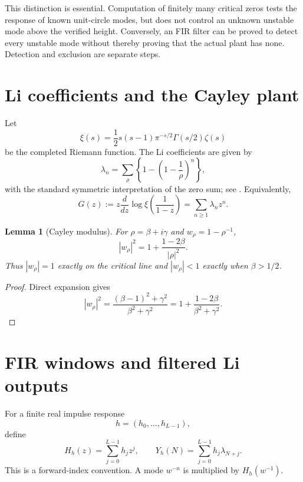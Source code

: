 \documentclass[11pt]{amsart}
\numberwithin{equation}{section}
\newtheorem{lemma}[theorem]{Lemma}
\theoremstyle{definition}
\theoremstyle{remark}
\begin{document}
This distinction is essential. Computation of finitely many critical zeros
tests the response of known unit-circle modes, but does not control an
unknown unstable mode above the verified height. Conversely, an FIR filter
can be proved to detect every unstable mode without thereby proving that the
actual plant has none. Detection and exclusion are separate steps.

\section{Li coefficients and the Cayley plant}
\label{sec:modes}

Let
\[
 \xi(s)=\frac12s(s-1)\pi^{-s/2}\Gamma(s/2)\zeta(s)
\]
be the completed Riemann function. The Li coefficients are given by
\begin{equation}
 \lambda_n=\sum_\rho\left\{1-\left(1-\frac1\rho\right)^n\right\},
                                                        \label{eq:2.1}
\end{equation}
with the standard symmetric interpretation of the zero sum; see
\cite{Li,BombieriLagarias}. Equivalently,
\begin{equation}
 G(z):=z\frac{d}{dz}\log\xi\!\left(\frac1{1-z}\right)
      =\sum_{n\ge1}\lambda_nz^n.                         \label{eq:2.2}
\end{equation}

\begin{lemma}[Cayley modulus]
For \(\rho=\beta+i\gamma\) and \(w_\rho=1-\rho^{-1}\),
\begin{equation}
 |w_\rho|^2=1+\frac{1-2\beta}{|\rho|^2}.                 \label{eq:2.3}
\end{equation}
Thus \(|w_\rho|=1\) exactly on the critical line and
\(|w_\rho|<1\) exactly when \(\beta>1/2\).
\end{lemma}

\begin{proof}
Direct expansion gives
\[
 |w_\rho|^2
 =\frac{(\beta-1)^2+\gamma^2}{\beta^2+\gamma^2}
 =1+\frac{1-2\beta}{\beta^2+\gamma^2}.
\]
\end{proof}

\section{FIR windows and filtered Li outputs}

For a finite real impulse response
\[
 h=(h_0,\ldots,h_{L-1}),
\]
define
\begin{equation}
 H_h(z)=\sum_{j=0}^{L-1}h_jz^j,\qquad
 Y_h(N)=\sum_{j=0}^{L-1}h_j\lambda_{N+j}.                \label{eq:3.1}
\end{equation}
This is a forward-index convention. A mode \(w^{-n}\) is multiplied by
\(H_h(w^{-1})\).
\end{document}
